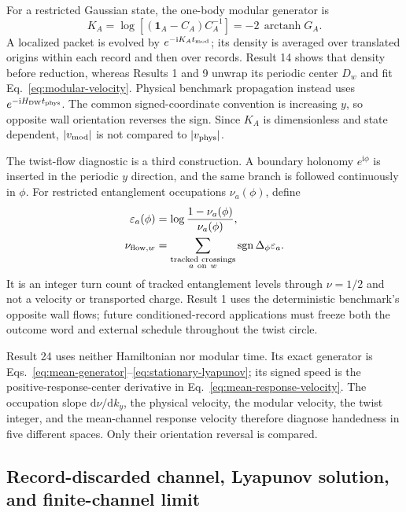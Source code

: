 \documentclass[aps,prb,twocolumn,floatfix,nofootinbib,superscriptaddress]{revtex4-2}
\newcommand{\ii}{\mathrm{i}}
\newcommand{\dd}{\mathrm{d}}
\begin{document}
For a restricted Gaussian state, the one-body modular generator is
\begin{equation}
 K_A=\log[(\mathbf{1}_A-C_A)C_A^{-1}]
 =-2\,\operatorname{arctanh}G_A .
 \label{eq:atlas-modular-generator}
\end{equation}
A localized packet is evolved by $e^{-\ii K_At_{\rm mod}}$; its density is averaged over
translated origins within each record and then over records.  Result 14 shows that density
before reduction, whereas Results 1 and 9 unwrap its periodic center $D_w$ and fit
Eq.~\eqref{eq:modular-velocity}.  Physical benchmark propagation instead uses
$e^{-\ii H_{\rm DW}t_{\rm phys}}$.  The common signed-coordinate convention is increasing
$y$, so opposite wall orientation reverses the sign.  Since $K_A$ is dimensionless and
state dependent, $|v_{\rm mod}|$ is not compared to $|v_{\rm phys}|$.

The twist-flow diagnostic is a third construction.  A boundary holonomy
$e^{\ii\phi}$ is inserted in the periodic $y$ direction, and the same branch is followed
continuously in $\phi$.  For restricted entanglement occupations
$\nu_a(\phi)$, define
\begin{equation}
 \begin{aligned}
 \varepsilon_a(\phi)&=\log\frac{1-\nu_a(\phi)}{\nu_a(\phi)},\\
 \nu_{{\rm flow},w}
 &=\sum_{\substack{\text{tracked crossings}\\a\ {\rm on}\ w}}
 \operatorname{sgn}\Delta_\phi\varepsilon_a .
 \end{aligned}
 \label{eq:atlas-twist-flow}
\end{equation}
It is an integer turn count of tracked entanglement levels through $\nu=1/2$ and not a
velocity or transported charge.  Result 1 uses the deterministic benchmark's opposite
wall flows; future conditioned-record applications must freeze both the outcome word and
external schedule throughout the twist circle.

Result 24 uses neither Hamiltonian nor modular time.  Its exact generator is
Eqs.~\eqref{eq:mean-generator}--\eqref{eq:stationary-lyapunov}; its signed speed is the
positive-response-center derivative in Eq.~\eqref{eq:mean-response-velocity}.  The
occupation slope $\dd\nu/\dd k_y$, the physical velocity, the modular velocity, the twist
integer, and the mean-channel response velocity therefore diagnose handedness in five
different spaces.  Only their orientation reversal is compared.

\subsection{Record-discarded channel, Lyapunov solution, and finite-channel limit}
\label{app:mean-channel-formalism}
\end{document}
